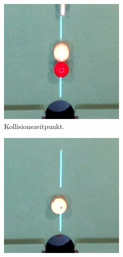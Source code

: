 \begin{figure}[h!]
\begin{subfigure}[t]{0.2\textwidth}
        \centering
        \includegraphics[width=1.0\linewidth]{../common/04_results/resources/simulation_vs_reality/simulation_vs_reality_1_0028_0032_collision_cut.jpg}
        \caption{Kollisionszeitpunkt.}
        \label{fig:simulation_vs_reality_1_0028_0032_collision}
    \end{subfigure}
    \hfill
    \begin{subfigure}[t]{0.2\textwidth}
        \centering
        \includegraphics[width=1.0\linewidth]{../common/04_results/resources/simulation_vs_reality/simulation_vs_reality_1_0028_0032_end_cut.jpg}

\end{subfigure}
\end{figure}
